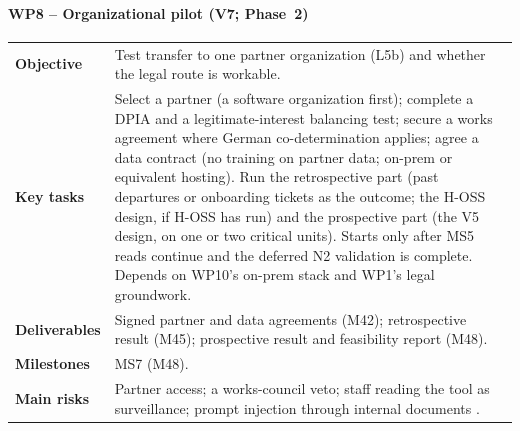 \paragraph{WP8 -- Organizational pilot (V7; Phase~2)}
\mbox{}\par
\begin{tabularx}{\linewidth}{@{}>{\bfseries}p{2.6cm}X@{}}
  \toprule
  Objective & Test transfer to one partner organization (L5b) and whether the legal route is
    workable. \\
  Key tasks & Select a partner (a software organization first); complete a DPIA and a
    legitimate-interest balancing test; secure a works agreement where German co-determination
    applies; agree a data contract (no training on partner data; on-prem or equivalent hosting).
    Run the retrospective part (past departures or onboarding tickets as the outcome; the H-OSS
    design, if H-OSS has run) and the prospective part (the V5 design, on one or two critical
    units). Starts only after MS5 reads continue and the deferred N2 validation is complete.
    Depends on WP10's on-prem stack and WP1's legal groundwork. \\
  Deliverables & Signed partner and data agreements (M42); retrospective result (M45);
    prospective result and feasibility report (M48). \\
  Milestones & MS7 (M48). \\
  Main risks & Partner access; a works-council veto; staff reading the tool as surveillance;
    prompt injection through internal documents \evlit{} \parencite{greshake2023not}. \\
  \bottomrule
\end{tabularx}

